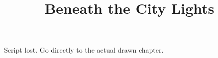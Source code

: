 \documentclass[11pt]{article}
\begin{document}
\ttfamily
\title{Beneath the City Lights}
\maketitle
Script lost. 
Go directly to the actual drawn chapter.
\end{document}
